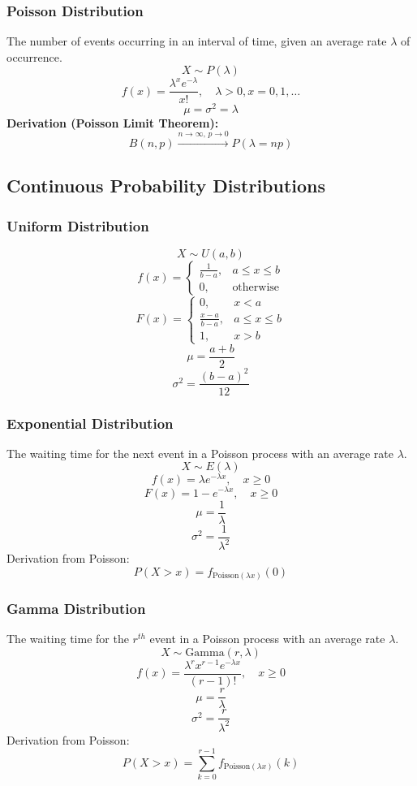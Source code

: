 \documentclass{article}
\begin{document}
\subsubsection{Poisson Distribution}
The number of events occurring in an interval of time, given an average rate \( \lambda \) of occurrence.
\[ X \sim P(\lambda) \]
\[ f(x) = \frac{\lambda^x e^{-\lambda}}{x!}, \quad \lambda>0, x=0,1,\dots \]
\[ \mu = \sigma^2 = \lambda \]
\textbf{Derivation (Poisson Limit Theorem):}
\[
    B(n, p) \xrightarrow{n \to \infty,\, p \to 0} P(\lambda = np)
\]

\subsection{Continuous Probability Distributions}

\subsubsection{Uniform Distribution}
\[
    X \sim U(a, b)
\]
\[
    f(x) =
    \begin{cases}
        \frac{1}{b-a}, & a \leq x \leq b \\
        0, & \text{otherwise}
    \end{cases}
\]
\[
    F(x) =
    \begin{cases}
        0, & x < a \\
        \frac{x-a}{b-a}, & a \leq x \leq b \\
        1, & x > b
    \end{cases}
\]
\[
    \mu = \frac{a+b}{2}
\]
\[
    \sigma^2 = \frac{(b-a)^2}{12}
\]

\subsubsection{Exponential Distribution}
The waiting time for the next event in a Poisson process with an average rate \( \lambda \).
\[ X \sim E(\lambda) \]
\[
    f(x) = \lambda e^{-\lambda x}, \quad x \geq 0
\]
\[
    F(x) = 1 - e^{-\lambda x}, \quad x \geq 0
\]
\[
    \mu = \frac{1}{\lambda}
\]
\[
    \sigma^2 = \frac{1}{\lambda^2}
\]
Derivation from Poisson:
\[
    P(X>x) = f_{\text{Poisson}(\lambda x)}(0)
\]

\subsubsection{Gamma Distribution}
The waiting time for the \( r^{th} \) event in a Poisson process with an average rate \( \lambda \).
\[ X \sim \mathrm{Gamma}(r, \lambda) \]
\[
    f(x) = \frac{\lambda^r x^{r-1} e^{-\lambda x}}{(r-1)!}, \quad x \geq 0
\]
\[
    \mu = \frac{r}{\lambda}
\]
\[
    \sigma^2 = \frac{r}{\lambda^2}
\]
Derivation from Poisson:
\[
    P(X > x) = \sum_{k=0}^{r-1} f_{\text{Poisson}(\lambda x)}(k)
\]
\end{document}
